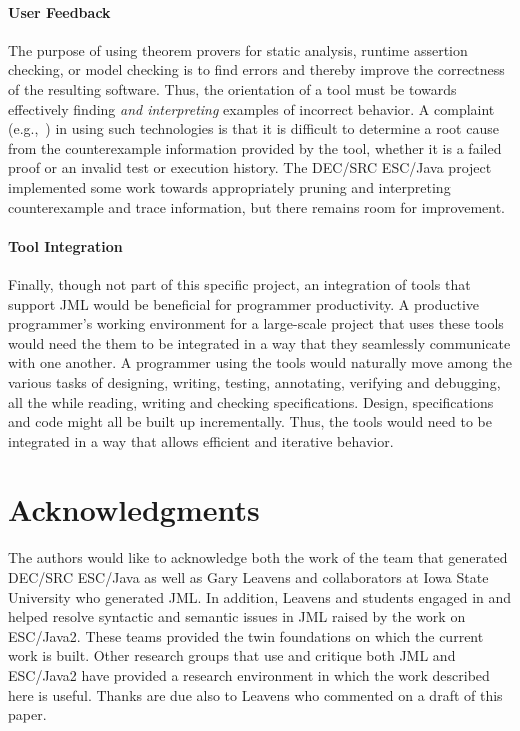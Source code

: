 \documentclass{sig-alternate}
\begin{document}
\paragraph*{User Feedback} The purpose of using theorem provers for
static analysis, runtime assertion checking, or model checking is to
find errors and thereby improve the correctness of the resulting
software.  Thus, the orientation of a tool must be towards effectively
finding \emph{and interpreting} examples of incorrect behavior.  A
complaint (e.g.,~\cite{GroceVisser03}) in using such technologies is that it is difficult
to determine a root cause from the counterexample information provided
by the tool, whether it is a failed proof or an invalid test or
execution history.  The DEC/SRC ESC/Java project implemented some work towards
appropriately pruning and interpreting counterexample and trace information, but
there remains room for improvement.

\paragraph*{Tool Integration} Finally, though not part of this specific
project, an integration of tools that support JML would be beneficial for
programmer productivity.
A productive programmer's working environment for a large-scale
project that uses these tools would need the them to be integrated in
a way that they seamlessly communicate with one another.  A
programmer using the tools would naturally move among the various
tasks of designing, writing,
testing, annotating, verifying and debugging, all the while reading, writing
and checking specifications.  Design, specifications and code might all
be built up incrementally.  Thus, the tools would
need to be integrated in a way that allows efficient and iterative
behavior.

\section{Acknowledgments}
The authors would like to acknowledge both the work of the team that
generated DEC/SRC ESC/Java as well as Gary Leavens and collaborators
at Iowa State University who generated JML.  In addition, Leavens and
students engaged in and helped resolve syntactic and semantic issues
in JML raised by the work on ESC/Java2.  These teams provided the twin
foundations on which the current work is built.  
Other research groups that use and critique both JML and ESC/Java2
have provided a research environment in which the work described here
is useful.   Thanks are due also to Leavens who commented on 
a draft of this paper.  
\end{document}
